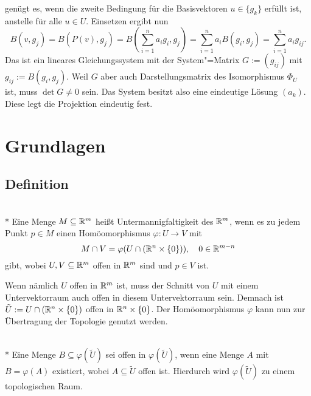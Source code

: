 genügt es, wenn die zweite Bedingung für die Basisvektoren
$u\in\{g_k\}$ erfüllt ist, anstelle für alle $u\in U$. Einsetzen
ergibt nun%
\begin{equation}
B(v,g_j) = B(P(v),g_j) = B(\sum_{i=1}^n a_i g_i,g_j)
= \sum_{i=1}^n a_i B(g_i,g_j) = \sum_{i=1}^n a_i g_{ij}.
\end{equation}
Das ist ein lineares Gleichungssystem mit der System"=Matrix
$G:=(g_{ij})$ mit $g_{ij}:=B(g_i,g_j)$. Weil $G$ aber auch
Darstellungsmatrix des Isomorphismus $\Phi_U$ ist, muss $\det G\ne 0$
sein. Das System besitzt also eine eindeutige Lösung $(a_k)$. Diese
legt die Projektion eindeutig fest.\;\qedsymbol



\section{Grundlagen}
\subsection{Definition}

\begin{definition}%
\mbox{}\\*
Eine Menge $M\subseteq\mathbb R^m$ heißt
Untermannigfaltigkeit des $\mathbb R^m$, wenn es zu jedem Punkt $p\in M$ einen
Homöomorphismus $\varphi\colon U\to V$ mit%
\begin{equation}
M\cap V = \varphi(U\cap(\mathbb R^n\times\{0\})),\quad 0\in\mathbb R^{m-n}
\end{equation}
gibt, wobei $U,V\subseteq\mathbb R^m$ offen in $\mathbb R^m$ sind und $p\in V$ ist.
\end{definition}
Wenn nämlich $U$ offen in $\mathbb R^m$ ist, muss der Schnitt von $U$
mit einem Untervektorraum auch offen in diesem Untervektorraum
sein. Demnach ist $\tilde U:=U\cap(\mathbb R^n\times\{0\})$ offen in
$\mathbb R^n\times\{0\}$. Der Homöomorphismus $\varphi$ kann nun zur
Übertragung der Topologie genutzt werden. 

\begin{theorem}\mbox{}\\*
Eine Menge $B\subseteq\varphi(\tilde U)$
sei offen in $\varphi(\tilde U)$, wenn eine Menge $A$ mit
$B=\varphi(A)$ existiert, wobei
$A\subseteq\tilde U$ offen ist.
Hierdurch wird $\varphi(\tilde U)$
zu einem topologischen Raum.
\end{theorem}

